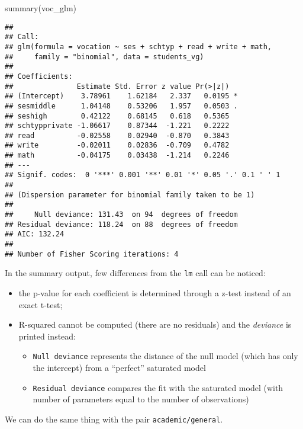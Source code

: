 \documentclass[
  oneside]{book}
\newenvironment{Shaded}{\begin{snugshade}}{\end{snugshade}}
\newcommand{\FunctionTok}[1]{\textcolor[rgb]{0.00,0.00,0.00}{#1}}
\newcommand{\NormalTok}[1]{#1}
\providecommand{\tightlist}{%
  \setlength{\itemsep}{0pt}\setlength{\parskip}{0pt}}
\begin{document}
\begin{Shaded}
\begin{Highlighting}[]
\FunctionTok{summary}\NormalTok{(voc\_glm)}
\end{Highlighting}
\end{Shaded}

\begin{verbatim}
## 
## Call:
## glm(formula = vocation ~ ses + schtyp + read + write + math, 
##     family = "binomial", data = students_vg)
## 
## Coefficients:
##               Estimate Std. Error z value Pr(>|z|)  
## (Intercept)    3.78961    1.62184   2.337   0.0195 *
## sesmiddle      1.04148    0.53206   1.957   0.0503 .
## seshigh        0.42122    0.68145   0.618   0.5365  
## schtypprivate -1.06617    0.87344  -1.221   0.2222  
## read          -0.02558    0.02940  -0.870   0.3843  
## write         -0.02011    0.02836  -0.709   0.4782  
## math          -0.04175    0.03438  -1.214   0.2246  
## ---
## Signif. codes:  0 '***' 0.001 '**' 0.01 '*' 0.05 '.' 0.1 ' ' 1
## 
## (Dispersion parameter for binomial family taken to be 1)
## 
##     Null deviance: 131.43  on 94  degrees of freedom
## Residual deviance: 118.24  on 88  degrees of freedom
## AIC: 132.24
## 
## Number of Fisher Scoring iterations: 4
\end{verbatim}

In the summary output, few differences from the \texttt{lm} call
can be noticed:

\begin{itemize}
\tightlist
\item
  the p-value for each coefficient is determined through a z-test
  instead of an exact t-test;
\item
  R-squared cannot be computed (there are no residuals) and the
  \emph{deviance} is printed instead:

  \begin{itemize}
  \tightlist
  \item
    \texttt{Null\ deviance} represents the distance of the null model
    (which has only the intercept) from a ``perfect'' saturated model
  \item
    \texttt{Residual\ deviance} compares the fit with the saturated model (with number
    of parameters equal to the number of observations)
  \end{itemize}
\end{itemize}

We can do the same thing with the pair \texttt{academic/general}.
\end{document}
